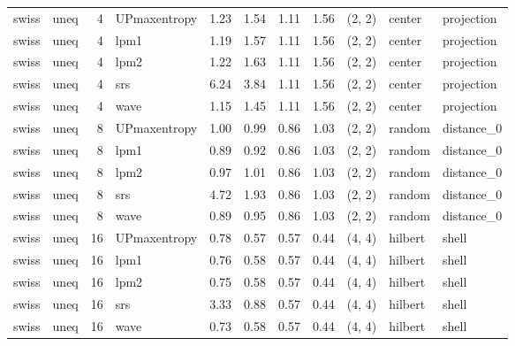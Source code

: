 \begin{tabular}{llrlrrrrlll}
 swiss &  uneq &  4 & UPmaxentropy &  1.23 &     1.54 &   1.11 &       1.56 & (2, 2) &      center & projection \\
 swiss &  uneq &  4 &         lpm1 &  1.19 &     1.57 &   1.11 &       1.56 & (2, 2) &      center & projection \\
 swiss &  uneq &  4 &         lpm2 &  1.22 &     1.63 &   1.11 &       1.56 & (2, 2) &      center & projection \\
 swiss &  uneq &  4 &          srs &  6.24 &     3.84 &   1.11 &       1.56 & (2, 2) &      center & projection \\
 swiss &  uneq &  4 &         wave &  1.15 &     1.45 &   1.11 &       1.56 & (2, 2) &      center & projection \\
 swiss &  uneq &  8 & UPmaxentropy &  1.00 &     0.99 &   0.86 &       1.03 & (2, 2) &      random & distance_0 \\
 swiss &  uneq &  8 &         lpm1 &  0.89 &     0.92 &   0.86 &       1.03 & (2, 2) &      random & distance_0 \\
 swiss &  uneq &  8 &         lpm2 &  0.97 &     1.01 &   0.86 &       1.03 & (2, 2) &      random & distance_0 \\
 swiss &  uneq &  8 &          srs &  4.72 &     1.93 &   0.86 &       1.03 & (2, 2) &      random & distance_0 \\
 swiss &  uneq &  8 &         wave &  0.89 &     0.95 &   0.86 &       1.03 & (2, 2) &      random & distance_0 \\
 swiss &  uneq & 16 & UPmaxentropy &  0.78 &     0.57 &   0.57 &       0.44 & (4, 4) &     hilbert &      shell \\
 swiss &  uneq & 16 &         lpm1 &  0.76 &     0.58 &   0.57 &       0.44 & (4, 4) &     hilbert &      shell \\
 swiss &  uneq & 16 &         lpm2 &  0.75 &     0.58 &   0.57 &       0.44 & (4, 4) &     hilbert &      shell \\
 swiss &  uneq & 16 &          srs &  3.33 &     0.88 &   0.57 &       0.44 & (4, 4) &     hilbert &      shell \\
 swiss &  uneq & 16 &         wave &  0.73 &     0.58 &   0.57 &       0.44 & (4, 4) &     hilbert &      shell \\
\bottomrule
\end{tabular}
